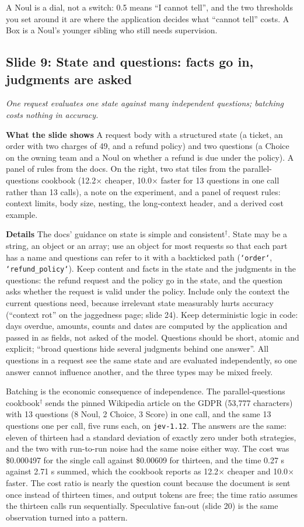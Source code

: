 \documentclass[11pt,letterpaper]{article}
\newcommand{\slide}[3]{%
  \subsection[Slide #1: #2]{Slide #1: #2}%
  {\color{muted}\itshape #3\par}\medskip}
\newcommand{\para}[1]{\medskip\noindent\textbf{#1}\quad}
\newenvironment{intuition}{\begin{tcolorbox}[intuitionbox]}{\end{tcolorbox}}
\begin{document}
\begin{intuition}
A Noul is a dial, not a switch: 0.5 means ``I cannot tell'', and the two thresholds you set around it are where the application decides what ``cannot tell'' costs. A Box is a Noul's younger sibling who still needs supervision.
\end{intuition}

\slide{9}{State and questions: facts go in, judgments are asked}{One request evaluates one state against many independent questions; batching costs nothing in accuracy.}

\para{What the slide shows} A request body with a structured state (a ticket, an order with two charges of 49, and a refund policy) and two questions (a Choice on the owning team and a Noul on whether a refund is due under the policy). A panel of rules from the docs. On the right, two stat tiles from the parallel-questions cookbook (12.2$\times$ cheaper, 10.0$\times$ faster for 13 questions in one call rather than 13 calls), a note on the experiment, and a panel of request rules: context limits, body size, nesting, the long-context header, and a derived cost example.

\para{Details} The docs' guidance on state is simple and consistent$^\dagger$. State may be a string, an object or an array; use an object for most requests so that each part has a name and questions can refer to it with a backticked path (\texttt{`order`}, \texttt{`refund\_policy`}). Keep content and facts in the state and the judgments in the questions: the refund request and the policy go in the state, and the question asks whether the request is valid under the policy. Include only the context the current questions need, because irrelevant state measurably hurts accuracy (``context rot'' on the jaggedness page; slide 24). Keep deterministic logic in code: days overdue, amounts, counts and dates are computed by the application and passed in as fields, not asked of the model. Questions should be short, atomic and explicit; ``broad questions hide several judgments behind one answer''. All questions in a request see the same state and are evaluated independently, so one answer cannot influence another, and the three types may be mixed freely.

Batching is the economic consequence of independence. The parallel-questions cookbook$^\dagger$ sends the pinned Wikipedia article on the GDPR (53,777 characters) with 13 questions (8 Noul, 2 Choice, 3 Score) in one call, and the same 13 questions one per call, five runs each, on \texttt{jev-1.12}. The answers are the same: eleven of thirteen had a standard deviation of exactly zero under both strategies, and the two with run-to-run noise had the same noise either way. The cost was \$0.000497 for the single call against \$0.00609 for thirteen, and the time 0.27 s against 2.71 s summed, which the cookbook reports as 12.2$\times$ cheaper and 10.0$\times$ faster. The cost ratio is nearly the question count because the document is sent once instead of thirteen times, and output tokens are free; the time ratio assumes the thirteen calls run sequentially. Speculative fan-out (slide 20) is the same observation turned into a pattern.
\end{document}

